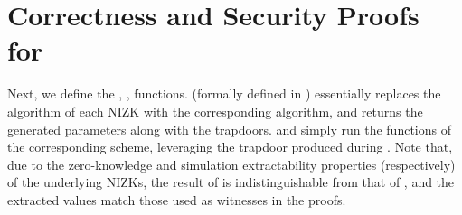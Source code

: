 \section{Correctness and Security Proofs for \CUASGen}
\label{app:uas-proofs}

Next, we define the \SimSetup, \ExtractIssue, \ExtractSign functions. \SimSetup
(formally defined in ) essentially replaces the
\Setup algorithm of each NIZK with the corresponding \NIZKSimSetup algorithm,
and returns the generated parameters along with the
trapdoors. \ExtractIssue and \ExtractSign simply run the \Extract functions
of the corresponding \NIZK scheme, leveraging the trapdoor produced during
\SimSetup. Note that, due to the zero-knowledge and simulation extractability
properties (respectively) of the underlying NIZKs, the result of \SimSetup
is indistinguishable from that of \Setup, and the extracted values match those
used as witnesses in the proofs.

